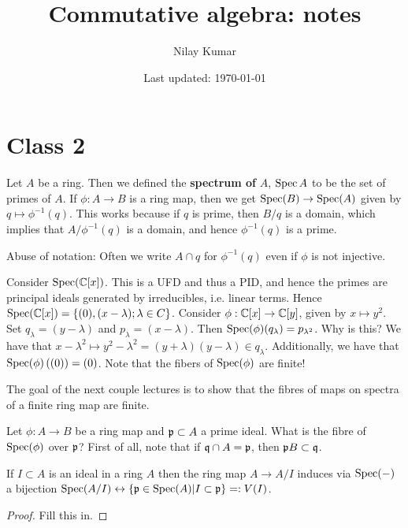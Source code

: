 \documentclass{../mathnotes}
\title{Commutative algebra: notes}
\author{Nilay Kumar}
\date{Last updated: \today}
\begin{document}
\maketitle


\section{Class 2}

\begin{defn}
    Let $A$ be a ring. Then we defined the \textbf{spectrum of} $A$, $\operatorname{Spec} A$ to be the set of primes of $A$.
    If $\phi:A\to B$ is a ring map, then we get $\operatorname{Spec}(B)\to\operatorname{Spec}(A)$ given by $q\mapsto \phi^{-1}(q)$. This works because
    if $q$ is prime, then $B/q$ is a domain, which implies that $A/\phi^{-1}(q)$ is a domain, and hence $\phi^{-1}(q)$ is a prime.
\end{defn}

\begin{rem}
    Abuse of notation: Often we write $A\cap q$ for $\phi^{-1}(q)$ even if $\phi$ is not injective.
\end{rem}

\begin{exmp}
    Consider $\operatorname{Spec}(\mathbb{C}[x])$. This is a UFD and thus a PID, and hence the primes are principal ideals generated by irreducibles, i.e.
    linear terms. Hence $\operatorname{Spec}(\mathbb{C}[x])=\left\{ (0),(x-\lambda);\lambda\in C \right\}$. Consider $\phi:\mathbb{C}[x]\to\mathbb{C}[y]$, given by $x\mapsto y^2$.
    Set $q_\lambda=(y-\lambda)$ and $p_\lambda=(x-\lambda)$. Then $\operatorname{Spec}(\phi)(q_\lambda)=p_{\lambda^2}$. Why is this? We have that $x-\lambda^2\mapsto y^2-\lambda^2=(y+\lambda)(y-\lambda)\in q_\lambda$.
    Additionally, we have that $\operatorname{Spec}(\phi)\left( (0) \right)=(0)$. Note that the fibers of $\operatorname{Spec}(\phi)$ are finite!
\end{exmp}

The goal of the next couple lectures is to show that the fibres of maps on spectra of a finite ring map are finite.

Let $\phi: A\to B$ be a ring map and $\mathfrak p\subset A$ a prime ideal. What is the fibre of $\operatorname{Spec}(\phi)$ over $\mathfrak p$?
First of all, note that if $\mathfrak q\cap A=\mathfrak p$, then $\mathfrak p B\subset\mathfrak q$.

\begin{lem}
    If $I\subset A$ is an ideal in a ring $A$ then the ring map $A\to A/I$ induces via $\operatorname{Spec}(-)$ a bijection $\operatorname{Spec}(A/I)\leftrightarrow\left\{ \mathfrak p\in\operatorname{Spec}(A) | I\subset \mathfrak p \right\}=:V(I)$.
\end{lem}
\begin{proof}
    Fill this in.
\end{proof}
\end{document}
